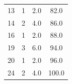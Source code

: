 \documentclass{article}
\begin{document}
\begin{longtable}{|c|c|c|c|}
    13              & 1                  & 2.0                 & 82.0                           \\
    14              & 2                  & 4.0                 & 86.0                           \\
    16              & 1                  & 2.0                 & 88.0                           \\
    19              & 3                  & 6.0                 & 94.0                           \\
    20              & 1                  & 2.0                 & 96.0                           \\
    24              & 2                  & 4.0                 & 100.0                          \\
\end{longtable}
\restoregeometry
\end{document}
